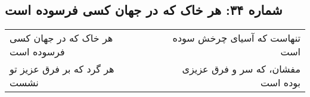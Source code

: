 \begin{center}
\section*{شماره ۳۴: هر خاک که در جهان کسی فرسوده است}
\label{sec:034}
\begin{longtable}{l p{0.5cm} r}
هر خاک که در جهان کسی فرسوده است
&&
تنهاست که آسیای چرخش سوده است
\\
هر گرد که بر فرق عزیز تو نشست
&&
مفشان، که سر و فرق عزیزی بوده است
\\
\end{longtable}
\end{center}
